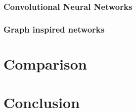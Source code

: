 \documentclass{article}
\begin{document}
\subsubsection{Convolutional Neural Networks}


\subsubsection{Graph inspired networks}


\section{Comparison}


\section{Conclusion}


\newpage %

  


\end{document}
